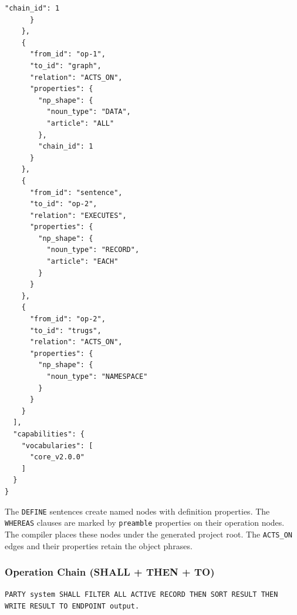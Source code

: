 \documentclass{article}
\begin{document}
\begin{lstlisting}[style=json]
        "chain_id": 1
      }
    },
    {
      "from_id": "op-1",
      "to_id": "graph",
      "relation": "ACTS_ON",
      "properties": {
        "np_shape": {
          "noun_type": "DATA",
          "article": "ALL"
        },
        "chain_id": 1
      }
    },
    {
      "from_id": "sentence",
      "to_id": "op-2",
      "relation": "EXECUTES",
      "properties": {
        "np_shape": {
          "noun_type": "RECORD",
          "article": "EACH"
        }
      }
    },
    {
      "from_id": "op-2",
      "to_id": "trugs",
      "relation": "ACTS_ON",
      "properties": {
        "np_shape": {
          "noun_type": "NAMESPACE"
        }
      }
    }
  ],
  "capabilities": {
    "vocabularies": [
      "core_v2.0.0"
    ]
  }
}
\end{lstlisting}

The \texttt{DEFINE} sentences create named nodes with definition properties. The \texttt{WHEREAS} clauses are marked by \texttt{preamble} properties on their operation nodes. The compiler places these nodes under the generated project root. The \texttt{ACTS\_ON} edges and their properties retain the object phrases.

\subsubsection*{Operation Chain (SHALL + THEN + TO)}

\texttt{PARTY system SHALL FILTER ALL ACTIVE RECORD THEN SORT RESULT THEN WRITE RESULT TO ENDPOINT output.}
\end{document}
